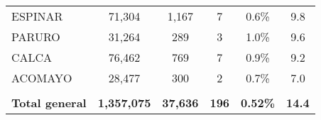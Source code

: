 \begin{tabular}{lccccc}
	\cellcolor[HTML]{FFFF99}ESPINAR                                 & 71,304               & 1,167                                & 7                    & 0.6\%                      & 9.8                                         \\
	\cellcolor[HTML]{FFFF99}PARURO                                  & 31,264               & 289                                  & 3                    & 1.0\%                      & 9.6                                         \\
	\cellcolor[HTML]{FFFF99}CALCA                                   & 76,462               & 769                                  & 7                    & 0.9\%                      & 9.2                                         \\
	\cellcolor[HTML]{FFFF99}ACOMAYO                                 & 28,477               & 300                                  & 2                    & 0.7\%                      & 7.0                                         \\
	& \multicolumn{1}{l}{} & \multicolumn{1}{l}{}                 & \multicolumn{1}{l}{} & \multicolumn{1}{l}{}       & \multicolumn{1}{l}{}                        \\
	\rowcolor[HTML]{DDEBF7} 
	\textbf{Total general}                                          & \textbf{1,357,075}   & \textbf{37,636}                      & \textbf{196}         & \textbf{0.52\%}            & \textbf{14.4}                              
\end{tabular}
